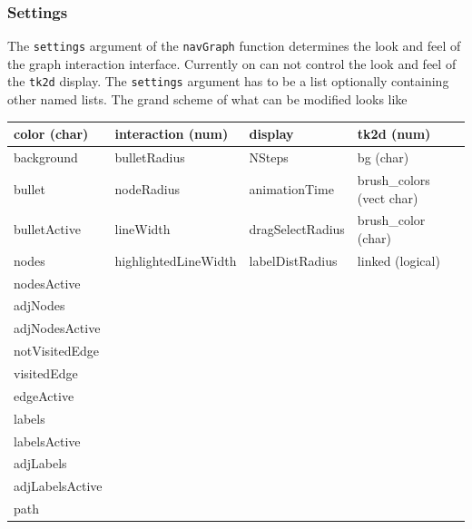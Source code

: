 \documentclass[12pt,oneside,titlepage,letter]{article}
\newcommand{\modify}[1]{{\color{blue}#1}}
\begin{document}
\subsubsection{Settings}
The \texttt{settings} argument of the \texttt{navGraph} function determines the look and feel of the graph interaction interface. \modify{Currently on can not control the look and feel of the \texttt{tk2d} display}. The \texttt{settings} argument has to be a list optionally containing other named lists. The grand scheme of what can be modified looks like

\begin{center}
\begin{tabular}{|p{4cm}|p{4cm}|p{4cm}|p{4cm}|}
  \hline 
  \textbf{color} (char) & \textbf{interaction} (num) & \textbf{display} & \textbf{tk2d} (num)\\
  \hline
   background       &    bulletRadius          &   NSteps           &   bg (char) \\
   bullet           &    nodeRadius            &   animationTime    &   brush\_colors (vect char)\\
   bulletActive     &    lineWidth             &   dragSelectRadius &    brush\_color (char)\\
   nodes            &    highlightedLineWidth  &   labelDistRadius  &    linked (logical)\\
   nodesActive      &                          &                    &    \\
   adjNodes         &                          &                    &    \\
   adjNodesActive   &                          &                    &    \\
   notVisitedEdge   &                          &                    &    \\
   visitedEdge      &                          &                    &    \\
   edgeActive       &                          &                    &    \\
   labels           &                          &                    &    \\
   labelsActive     &                          &                    &    \\
   adjLabels        &                          &                    &    \\
   adjLabelsActive  &                          &                    &    \\
   path             &                          &                    &    \\
   \hline
\end{tabular}
\end{center}
\end{document}

